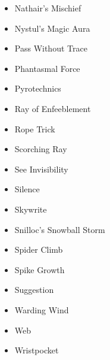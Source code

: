 \documentclass[a4paper,10pt,twoside,twocolumn, bg=print]{dndbook} %
\begin{document}
\begin{itemize}
				\item Nathair's Mischief
				\item Nystul's Magic Aura
				\item Pass Without Trace
				\item Phantasmal Force
				\item Pyrotechnics
				\item Ray of Enfeeblement
				\item Rope Trick
				\item Scorching Ray
				\item See Invisibility
				\item Silence
				\item Skywrite
				\item Snilloc's Snowball Storm
				\item Spider Climb
				\item Spike Growth
				\item Suggestion
				\item Warding Wind
				\item Web
				\item Wristpocket
			\end{itemize}
		\vfill\pagebreak
\end{document}
